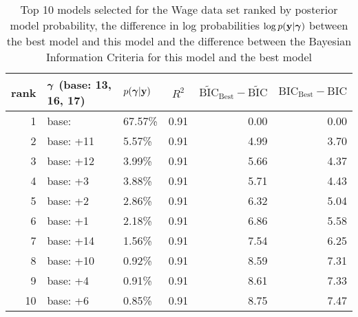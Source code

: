\documentclass{amsart}
\begin{document}
\begin{table}
\label{tab:numerical_results_wage}
\caption{Top 10 models selected for the Wage data set ranked by posterior model probability, the difference
					in log probabilities $\log p({\bf y}|{\boldsymbol \gamma})$ between the best model and this model and the difference
					between the Bayesian Information Criteria for this model and the best model}
\begin{center}
\begin{tabular}{r|l|l|c|r|r}
rank & ${\boldsymbol \gamma}$ (base: 13, 16, 17) & $p({\boldsymbol \gamma}|{\bf y})$ & $R^2$ & $\widetilde{\text{BIC}}_\text{Best} - \widetilde{\text{BIC}}$ & $\text{BIC}_\text{Best} - \text{BIC}$ \\
\hline
1 & base: &  67.57\%&  0.91&  0.00&  0.00\\
2 & base: +11&  5.57\%&  0.91&  4.99&  3.70\\
3 & base: +12&  3.99\%&  0.91&  5.66&  4.37\\
4 & base: +3&  3.88\%&  0.91&  5.71&  4.43\\
5 & base: +2&  2.86\%&  0.91&  6.32&  5.04\\
6 & base: +1&  2.18\%&  0.91&  6.86&  5.58\\
7 & base: +14&  1.56\%&  0.91&  7.54&  6.25\\
8 & base: +10&  0.92\%&  0.91&  8.59&  7.31\\
9 & base: +4&  0.91\%&  0.91&  8.61&  7.33\\
10 & base: +6&  0.85\%&  0.91&  8.75&  7.47\\
\end{tabular}
\end{center}
\end{table}
\end{document}
